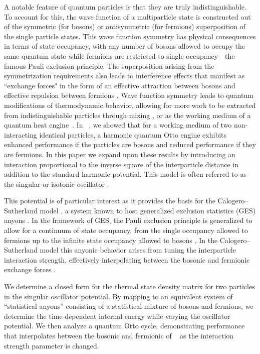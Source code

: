 \documentclass[preprints,article,accept,moreauthors,pdftex]{Definitions/mdpi}
\begin{document}
A notable feature of quantum particles is that they are truly indistinguishable. To account for this, the wave function of a multiparticle state is constructed out of the symmetric (for bosons) or antisymmetric (for fermions) superposition of the single particle states. This wave function symmetry has physical consequences in terms of state occupancy, with any number of bosons allowed to occupy the same quantum state while fermions are restricted to single occupancy---the famous Pauli exclusion principle. The superposition arising from the symmetrization requirements also leads to interference effects that manifest as ``exchange forces" in the form of an effective attraction between bosons and effective repulsion between fermions \cite{Griffiths}. Wave function symmetry leads to quantum modifications of thermodynamic behavior, allowing for more work to be extracted from indistinguishable particles through mixing \cite{Yadin2021}, or as the working medium of a quantum heat engine~\cite{Jaramillo2016, Huang2017, Myers2020, Myers2021}. In ~\cite{Myers2020}, we showed that for a working medium of two non-interacting identical particles, a harmonic quantum Otto engine exhibits enhanced performance if the particles are bosons and reduced performance if they are fermions. In this paper we expand upon these results by introducing an interaction proportional to the inverse square of the interparticle distance in addition to the standard harmonic potential. This model is often referred to as the singular \cite{Nogueira2016} or isotonic oscillator \cite{Weissman1979}. 

This potential is of particular interest as it provides the basis for the Calogero--Sutherland model \cite{Calogero1969, Sutherland1988}, a system known to host generalized exclusion statistics (GES) anyons \cite{Haldane1991, Murthy1994}. In the framework of GES, the Pauli exclusion principle is generalized to allow for a continuum of state occupancy, from the single occupancy allowed to fermions up to the infinite state occupancy allowed to bosons \cite{Haldane1991}. In the Calogero--Sutherland model this anyonic behavior arises from tuning the interparticle interaction strength, effectively interpolating between the bosonic and fermionic exchange forces \cite{Murthy1994}.        
 
We determine a closed form for the thermal state density matrix for two particles in the singular oscillator potential. By mapping to an equivalent system of ``statistical anyons'' \cite{Myers2021} consisting of a statistical mixture of bosons and fermions, we determine the time-dependent internal energy while varying the oscillator potential. We then analyze a quantum Otto cycle, demonstrating performance that interpolates between the bosonic and fermionic of ~\cite{Myers2020} as the interaction strength parameter is changed.  
\end{document}
